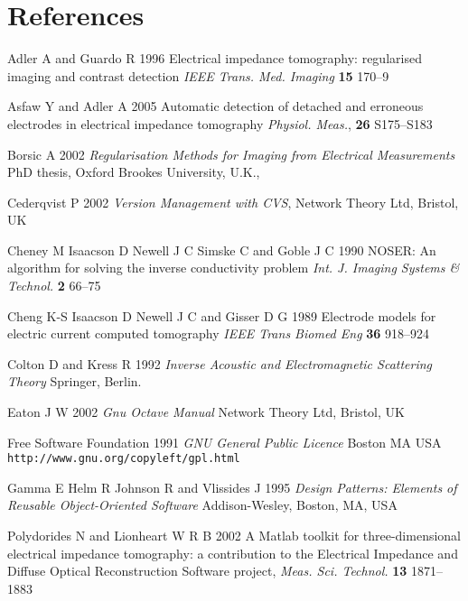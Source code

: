 \documentclass[12pt]{iopart}
\begin{document}
\section*{References}
\begin{thebibliography}{99}

Adler A and Guardo R
1996
Electrical impedance tomography: regularised imaging and contrast detection 
\textit{IEEE Trans. Med. Imaging} \textbf{15} 170--9

Asfaw Y and Adler A
 2005
Automatic detection of detached and erroneous electrodes in electrical impedance tomography
{\it Physiol. Meas.}, {\bf 26} S175--S183

Borsic A 2002
{\it Regularisation Methods for Imaging from Electrical Measurements}
PhD thesis, Oxford Brookes University, U.K.,

Cederqvist P 2002
{\it Version Management with CVS},
Network Theory Ltd, Bristol, UK

Cheney M
Isaacson D
Newell J C
Simske C and
Goble J C 1990
NOSER: An algorithm for solving the inverse conductivity problem
\textit{Int. J. Imaging Systems \& Technol.} \textbf{2} 66--75


Cheng K-S
Isaacson D
Newell J C and
Gisser D G
1989
Electrode models for electric current
computed tomography
{\it IEEE Trans Biomed Eng}
{\bf 36} 918--924

Colton D and Kress R 1992
{\it Inverse Acoustic and Electromagnetic Scattering Theory}
Springer, Berlin.


Eaton J W 2002
{\it Gnu Octave Manual}
Network Theory Ltd, Bristol, UK

Free Software Foundation 1991
{\it GNU General Public Licence}
Boston MA USA
{\tt http://www.gnu.org/copyleft/gpl.html}

Gamma E Helm R Johnson R and Vlissides J 1995
{\it Design Patterns: Elements of Reusable Object-Oriented Software}
Addison-Wesley, Boston, MA, USA

Polydorides N and Lionheart W R B
2002
A Matlab toolkit for three-dimensional electrical impedance
tomography: a contribution to the Electrical Impedance and
Diffuse Optical Reconstruction Software project,
{\it Meas. Sci. Technol.} {\bf 13} 1871--1883 


\end{thebibliography}
\end{document}
